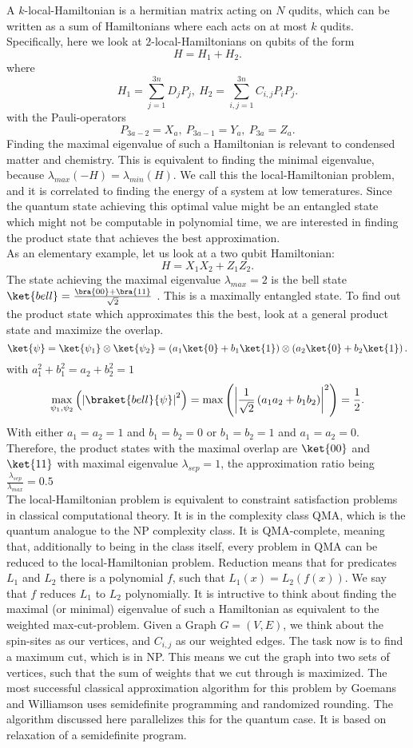 A $k$-local-Hamiltonian is a hermitian matrix acting on $N$ qudits, which can be written as a sum of Hamiltonians where each acts on at most $k$ qudits.
Specifically, here we look at  $2$-local-Hamiltonians on qubits of the form \[
H = H_1+H_2
.\]
where \[
	H_1 = \sum_{j=1}^{3n} D_jP_j, ~ H_2  = \sum_{i,j=1}^{3n} C_{i,j}P_iP_j
.\]
with the Pauli-operators \[
	P_{3a-2}=X_a, ~ P_{3a-1}=Y_a, ~ P_{3a}=Z_a
.\]
Finding the maximal eigenvalue of such a Hamiltonian is relevant to condensed matter and chemistry.
This is equivalent to finding the minimal eigenvalue, because $\lambda_{max}(-H)=\lambda_{min}(H)$. \cite{gharibian19}
We call this the local-Hamiltonian problem, and it is correlated to finding the energy of a system at low temeratures.
Since the quantum state achieving this optimal value might be an entangled state which might not be computable in polynomial time, we are interested in finding the product state that achieves the best approximation. \\
As an elementary example, let us look at a two qubit Hamiltonian: \[
H=X_1X_2+Z_1Z_2
.\]
The state achieving the maximal eigenvalue $\lambda_{max}=2$ is the bell state $\ket{bell}=\frac{\bra{00}+\bra{11}}{\sqrt{2}}$ .
This is a maximally entangled state.
To find out the product state which approximates this the best, look at a general product state and maximize the overlap.
\[
	\ket{\psi}=\ket{\psi_1}\otimes\ket{\psi_2}=\left(a_1\ket{0}+b_1\ket{1}\right)\otimes\left(a_2\ket{0}+b_2\ket{1}\right)
.\] with $a_1^2+b_1^2=a_2+b_2^2=1$
\[
\max_{\psi_1,\psi_2}\left(\left|\braket{bell}{\psi}\right|^2\right)=\max\left(\left|\frac{1}{\sqrt{2}}\left(a_1a_2+b_1b_2\right)\right|^2\right)=\frac{1}{2}
.\]
With either $a_1=a_2=1$ and $b_1=b_2=0$ or $b_1=b_2=1$ and $a_1=a_2=0$.
Therefore, the product states with the maximal overlap are $\ket{00}$ and $\ket{11}$ with maximal eigenvalue $\lambda_{sep}=1$, the approximation ratio being  $\frac{\lambda_{sep}}{\lambda_{max}} = 0.5 $\\
The local-Hamiltonian problem is equivalent to constraint satisfaction problems in classical computational theory.
It is in the complexity class QMA, which is the quantum analogue to the NP complexity class.
It is QMA-complete, meaning that, additionally to being in the class itself, every problem in QMA can be reduced to the local-Hamiltonian problem.\cite{kempe06}
Reduction means that for predicates $L_1$ and $L_2$ there is a polynomial $f$, such that $L_1(x)=L_2(f(x))$.
We say that $f$ reduces  $L_1$ to $L_2$ polynomially.\cite{kitaev02}
It is intructive to think about finding the maximal (or minimal) eigenvalue of such a Hamiltonian as equivalent to the weighted max-cut-problem.
Given a Graph $G=(V,E)$, we think about the spin-sites as our vertices, and $C_{i,j}$ as our weighted edges.
The task now is to find a maximum cut, which is in NP.
This means we cut the graph into two sets of vertices, such that the sum of weights that we cut through is maximized.
The most successful classical approximation algorithm for this problem by Goemans and Williamson uses semidefinite programming and randomized rounding. \cite{goemans95}
The algorithm discussed here parallelizes this for the quantum case.
It is based on relaxation of a semidefinite program.
